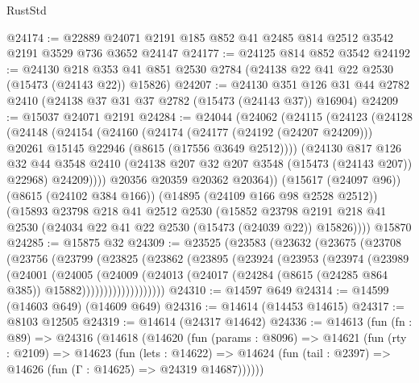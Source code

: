 \begin{lexlean}{RustStd}
\begin{coremodule}
@24174 := @22889 @24071 @2191 @185 @852 @41 @2485 @814 @2512 @3542 @2191 @3529 @736 @3652 @24147
@24177 := @24125 @814 @852 @3542
@24192 := @24130
    @218
    @353
    @41
    @851
    @2530
    @2784
    (@24138 @22 @41 @22 @2530 (@15473 (@24143 @22)) @15826)
@24207 := @24130
    @351
    @126
    @31
    @44
    @2782
    @2410
    (@24138 @37 @31 @37 @2782 (@15473 (@24143 @37)) @16904)
@24209 := @15037 @24071 @2191
@24284 := @24044
    (@24062
      (@24115
        (@24123
          (@24128
            (@24148
              (@24154
                (@24160
                  (@24174
                    (@24177 (@24192 (@24207 @24209)))
                    @20261
                    @15145
                    @22946
                    (@8615 (@17556 @3649 @2512))))
                (@24130
                  @817
                  @126
                  @32
                  @44
                  @3548
                  @2410
                  (@24138 @207 @32 @207 @3548 (@15473 (@24143 @207)) @22968)
                  @24209))))
          @20356
          @20359
          @20362
          @20364))
      (@15617 (@24097 @96))
      (@8615 (@24102 @384 @166))
      (@14895 (@24109 @166 @98 @2528 @2512))
      (@15893
        @23798
        @218
        @41
        @2512
        @2530
        (@15852
          @23798
          @2191
          @218
          @41
          @2530
          (@24034 @22 @41 @22 @2530 (@15473 (@24039 @22)) @15826))))
    @15870
@24285 := @15875 @32
@24309 := @23525
    (@23583
      (@23632
        (@23675
          (@23708
            (@23756
              (@23799
                (@23825
                  (@23862
                    (@23895
                      (@23924
                        (@23953
                          (@23974
                            (@23989
                              (@24001
                                (@24005
                                  (@24009
                                    (@24013
                                      (@24017
                                        (@24284 (@8615 (@24285 @864 @385)) @15882)))))))))))))))))))
@24310 := @14597 @649
@24314 := @14599 (@14603 @649) (@14609 @649)
@24316 := @14614 (@14453 @14615)
@24317 := @8103 @12505
@24319 := @14614 (@24317 @14642)
@24336 := @14613
    (fun (fn : @89) =>
    @24316
      (@14618
        (@14620
          (fun (params : @8096) =>
          @14621
            (fun (rty : @2109) =>
            @14623
              (fun (lets : @14622) =>
              @14624 (fun (tail : @2397) => @14626 (fun (Γ : @14625) => @24319 @14687))))))

\end{coremodule}
\end{lexlean}
